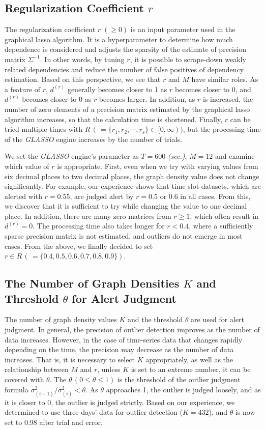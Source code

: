\documentclass[conference]{IEEEtran}
\begin{document}
\subsection{Regularization Coefficient $r$}
The regularization coefficient $r\;(\geq 0)$ is an input parameter used in the graphical lasso algorithm.
It is a hyperparameter to determine how much dependence is considered and adjusts the sparsity of the estimate of precision matrix $\Sigma^{-1}$.
In other words, by tuning $r$, it is possible to scrape-down weakly related dependencies and reduce the number of false positives of dependency estimation.
Based on this perspective, we see that $r$ and $M$ have similar roles.
As a feature of $r$, $d^{(r)}$ generally becomes closer to 1 as $r$ becomes closer to 0, and $d^{(r)}$ becomes closer to 0 as $r$ becomes larger.
In addition, as $r$ is increased, the number of zero elements of a precision matrix estimated by the graphical lasso algorithm increases, so that the calculation time is shortened.
Finally, $r$ can be tried multiple times with $R \, ( \, = \{r_1, r_2, \cdots, r_s\}\subset [0,\infty))$, but the processing time of the \textit{GLASSO} engine increases by the number of trials.

We set the \textit{GLASSO} engine's parameter as $T=600$ \textit{(sec.)}, $M=12$ and examine which value of $r$ is appropriate.
First, even when we try with varying values from six decimal places to two decimal places, the graph density value does not change significantly.
For example, our experience shows that time slot datasets, which are alerted with $r=0.55$, are judged alert by $r=$0.5 or 0.6 in all cases.
From this, we discover that it is sufficient to try while changing the value to one decimal place.
In addition, there are many zero matrices from $r\geq 1$, which often result in $d^{(r)}=0$.
The processing time also takes longer for $r < 0.4$, where a sufficiently sparse precision matrix is not estimated, and outliers do not emerge in most cases.
From the above, we finally decided to set $r \in R \, ( \, = \{0.4, 0.5, 0.6, 0.7, 0.8, 0.9\})$.



\subsection{The Number of Graph Densities $K$ and Threshold $\theta$ for Alert Judgment}
The number of graph density values $K$ and the threshold $\theta$ are used for alert judgment.
In general, the precision of outlier detection improves as the number of data increases.
However, in the case of time-series data that changes rapidly depending on the time, the precision may decrease as the number of data increases.
That is, it is necessary to select $K$ appropriately, as well as the relationship between $M$ and $r$, unless $K$ is set to an extreme number, it can be covered with $\theta$.
The $\theta \, (0\leq \theta \leq 1)$ is the threshold of the outlier judgment formula $\sigma^{2}_{(i+1)}/\sigma^{2}_{(i)}<\theta$.
As $\theta$ approaches 1, the outlier is judged loosely, and as it is closer to 0, the outlier is judged strictly.
Based on our experience, we determined to use three days' data for outlier detection ($K=432$), and $\theta$ is now set to 0.98 after trial and error.
\end{document}
